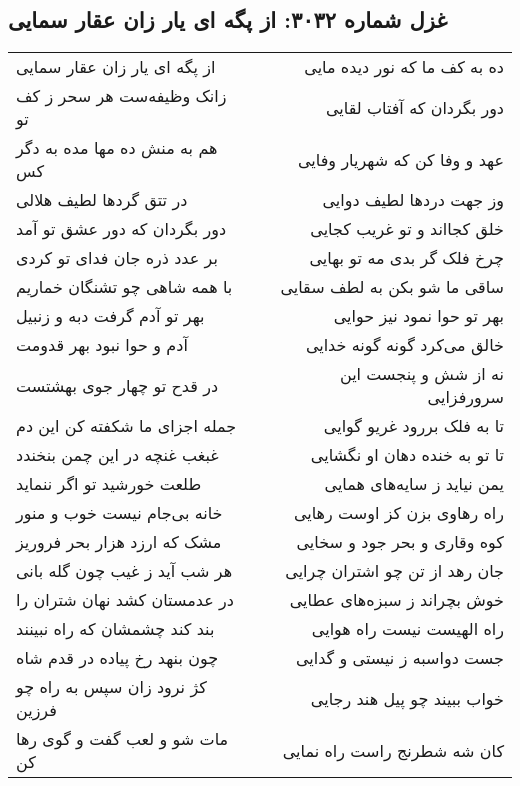 \begin{center}
\section*{غزل شماره ۳۰۳۲: از پگه ای یار زان عقار سمایی}
\label{sec:3032}
\begin{longtable}{l p{0.5cm} r}
از پگه ای یار زان عقار سمایی
&&
ده به کف ما که نور دیده مایی
\\
زانک وظیفه‌ست هر سحر ز کف تو
&&
دور بگردان که آفتاب لقایی
\\
هم به منش ده مها مده به دگر کس
&&
عهد و وفا کن که شهریار وفایی
\\
در تتق گردها لطیف هلالی
&&
وز جهت دردها لطیف دوایی
\\
دور بگردان که دور عشق تو آمد
&&
خلق کجااند و تو غریب کجایی
\\
بر عدد ذره جان فدای تو کردی
&&
چرخ فلک گر بدی مه تو بهایی
\\
با همه شاهی چو تشنگان خماریم
&&
ساقی ما شو بکن به لطف سقایی
\\
بهر تو آدم گرفت دبه و زنبیل
&&
بهر تو حوا نمود نیز حوایی
\\
آدم و حوا نبود بهر قدومت
&&
خالق می‌کرد گونه گونه خدایی
\\
در قدح تو چهار جوی بهشتست
&&
نه از شش و پنجست این سرورفزایی
\\
جمله اجزای ما شکفته کن این دم
&&
تا به فلک بررود غریو گوایی
\\
غبغب غنچه در این چمن بنخندد
&&
تا تو به خنده دهان او نگشایی
\\
طلعت خورشید تو اگر ننماید
&&
یمن نیاید ز سایه‌های همایی
\\
خانه بی‌جام نیست خوب و منور
&&
راه رهاوی بزن کز اوست رهایی
\\
مشک که ارزد هزار بحر فروریز
&&
کوه وقاری و بحر جود و سخایی
\\
هر شب آید ز غیب چون گله بانی
&&
جان رهد از تن چو اشتران چرایی
\\
در عدمستان کشد نهان شتران را
&&
خوش بچراند ز سبزه‌های عطایی
\\
بند کند چشمشان که راه نبینند
&&
راه الهیست نیست راه هوایی
\\
چون بنهد رخ پیاده در قدم شاه
&&
جست دواسبه ز نیستی و گدایی
\\
کژ نرود زان سپس به راه چو فرزین
&&
خواب ببیند چو پیل هند رجایی
\\
مات شو و لعب گفت و گوی رها کن
&&
کان شه شطرنج راست راه نمایی
\\
\end{longtable}
\end{center}
